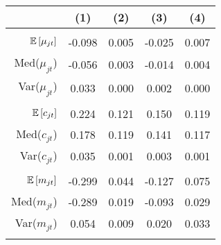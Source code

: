 \begin{tabular}{r|cccc}
 & (1) & (2) & (3) & (4) \\\hline &&&& \\ 
$\mathbb{E}\left[\mu_{jt}\right]$ & -0.098 & 0.005  & -0.025  & 0.007 \\ 
Med($\mu_{jt}$)& -0.056 & 0.003 & -0.014 & 0.004 \\
 Var($\mu_{jt}$)& 0.033 & 0.000 & 0.002 & 0.000 \\
 &&&&\\ 
$\mathbb{E}\left[c_{jt}\right]$ & 0.224 & 0.121  & 0.150  & 0.119 \\ 
Med($c_{jt}$)& 0.178 & 0.119 & 0.141 & 0.117 \\
 Var($c_{jt}$)& 0.035 & 0.001 & 0.003 & 0.001 \\
 &&&&\\ 
$\mathbb{E}\left[m_{jt}\right]$ & -0.299 & 0.044  & -0.127  & 0.075 \\ 
Med($m_{jt}$) & -0.289 & 0.019 & -0.093 & 0.029 \\
Var($m_{jt}$) & 0.054 & 0.009 & 0.020 & 0.033 \\
&&&&\\\hline 
\end{tabular}